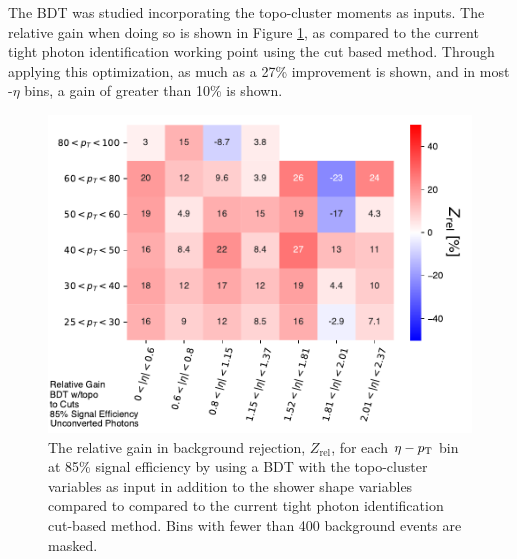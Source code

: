 The \gls{BDT} was studied incorporating the topo-cluster moments as inputs. The relative gain when doing so is shown in Figure \ref{fig:bdt-topo-vs-cuts}, as compared to the current tight photon identification working point using the cut based method. Through applying this optimization, as much as a 27\% improvement is shown, and in most \pt-$\eta$ bins, a gain of greater than 10\% is shown.
\begin{figure}[!htb]
    \centering
    \includegraphics[width=.85\textwidth]{chapters/chapter4_photonID/images/BDTtopo_v_cuts_normed.pdf}
    \caption[The relative gain in background rejection by using a \gls{BDT} with topo-cluster variables compared to the current tight photon identification methods]
    {The relative gain in background rejection, $Z_{\text{rel}}$, for each $\eta-p_{\text{T}}$ bin at 85\% signal efficiency by using a \gls{BDT} with the topo-cluster variables as input in addition to the shower shape variables compared to compared to the current tight photon identification cut-based method. Bins with fewer than 400 background events are masked.}
    \label{fig:bdt-topo-vs-cuts}
\end{figure}
